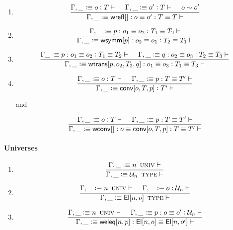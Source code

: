 \documentclass[11pt]{article}
\newcommand{\eqd}{\equiv}
\newcommand{\Eu}{{\cal U}}
\newcommand{\spc}{{\,\,\,\,\,\,\,}}
\newcommand{\ccolon}{\vcentcolon}
\newcommand{\ccheck}{\vcentcolon}            %
\newcommand{\csynth}{\vcentcolon\vcentcolon} %
\renewcommand{\csynth}{\ccheck}              %
\newcommand{\Univ}{\mathop{\text{ \sc univ}}}
\newcommand{\Type}{\mathop{\text{ \sc type}}}
\newcommand{\Okay}{\mathop{\text{ \sc okay}}}
\newcommand{\Context}{\vdash\Okay}
\renewcommand{\Context}{\vdash}
\newcommand{\ha}[2]{#1[#2]}
\newcommand{\El}{{\sf El}}
\newcommand{\annot}{{\sf annot}}
\newcommand{\haa}[2]{\ha\annot{#1,#2}}
\renewcommand{\haa}[2]{#1}
\newcommand{\conv}{{\sf conv}}
\newcommand{\wconv}{{\sf wconv}}
\newcommand{\weleq}{{\sf weleq}}
\newcommand{\wrefl}{{\sf wrefl}}
\newcommand{\wsymm}{{\sf wsymm}}
\newcommand{\wtrans}{{\sf wtrans}}
\newcommand{\var}{\char`_}
\newcommand{\defn}{\vcentcolon\equiv}
\begin{document}
\begin{enumerate}
\item 
\[\frac{
  \Gamma, \var \defn o \ccheck{T} \Context
  \spc
  \Gamma, \var \defn o' \ccheck{T} \Context
  \spc
  o \sim o'
  } {
  \Gamma, \var \defn  \ha\wrefl{}: o \eqd o' \ccolon T \eqd T \Context
  } 
\]

\item 
\[\frac
    {\Gamma, \var \defn p:o_1\eqd o_2 \ccolon T_1 \eqd T_2 \Context}
    {\Gamma, \var \defn \ha\wsymm{p}:o_2\eqd o_1 \ccolon T_2 \eqd T_1 \Context}\]

\item 
\[\frac{\Gamma \var\defn p:o_1\eqd o_2 \ccolon T_1 \eqd T_2 \Context 
  \spc
  \Gamma, \var\defn q:o_2\eqd o_3 \ccolon T_2 \eqd T_3 \Context
  } {
  \Gamma, \var \defn \ha\wtrans{p,o_2,T_2,q}:o_1\eqd o_3 \ccolon T_1 \eqd T_3 \Context}
\]

\item 
\[\frac
    { \Gamma, \var \defn o \ccolon T \Context \spc \Gamma, \var \defn p : T \eqd T' \Context }
    { \Gamma, \var \defn \ha\conv{o,T,p} \ccolon T' \Context}\]

and

\[\frac
    { \Gamma, \var \defn o \ccolon T \Context \spc \Gamma, \var \defn p : T \eqd T' \Context }
    { \Gamma, \var \defn \ha\wconv{} \ccolon o \eqd \ha\conv{o,T,p} \ccolon T \eqd T' \Context}\]




\end{enumerate}

\paragraph{Universes}

\begin{enumerate}

\item

\[\frac{\Gamma, \var \defn n \Univ \Context }{\Gamma, \var \defn \Eu_n \Type \Context }\]

\item

\[\frac{
  \Gamma, \var \defn n \Univ \Context 
  \spc
  \Gamma, \var \defn o \csynth{\Eu_n} \Context}{
  \Gamma, \var \defn \ha\El{n,o}\Type \Context }\]

\item 

\[\frac{
  \Gamma, \var \defn n \Univ \Context
  \spc
  \Gamma, \var \defn p : o \eqd o' \ccheck{\Eu_n} \Context
}
       {\Gamma, \var \defn \ha\weleq{n,p} : \ha\El{n,o} \eqd \ha\El{n,o'} \Context}\]

\end{enumerate}
\end{document}
